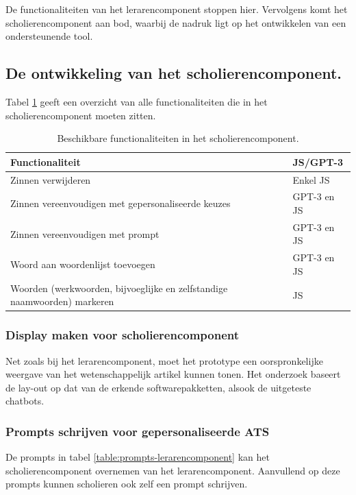 De functionaliteiten van het lerarencomponent stoppen hier. Vervolgens komt het scholierencomponent aan bod, waarbij de nadruk ligt op het ontwikkelen van een ondersteunende tool.

\subsection{De ontwikkeling van het scholierencomponent.}

Tabel \ref{table:beschikbare-functionaliteiten-scholierencomponent} geeft een overzicht van alle functionaliteiten die in het scholierencomponent moeten zitten.

\begin{table}
	\begin{tabular}{| m{10cm} | m{5cm} |}
		\hline
		\textbf{Functionaliteit} & \textbf{JS/GPT-3} \\ \hline
		Zinnen verwijderen & Enkel JS \\ \hline
		Zinnen vereenvoudigen met gepersonaliseerde keuzes & GPT-3 en JS \\ \hline
		Zinnen vereenvoudigen met prompt & GPT-3 en JS \\ \hline
		Woord aan woordenlijst toevoegen & GPT-3 en JS \\ \hline
		Woorden (werkwoorden, bijvoeglijke en zelfstandige naamwoorden) markeren & JS \\ \hline
	\end{tabular}
	\caption{Beschikbare functionaliteiten in het scholierencomponent.}
	\label{table:beschikbare-functionaliteiten-scholierencomponent}
\end{table}

\subsubsection{Display maken voor scholierencomponent}

Net zoals bij het lerarencomponent, moet het prototype een oorspronkelijke weergave van het wetenschappelijk artikel kunnen tonen. Het onderzoek baseert de lay-out op dat van de erkende softwarepakketten, alsook de uitgeteste chatbots. 

\subsubsection{Prompts schrijven voor gepersonaliseerde ATS}

De prompts in tabel \ref{table:prompts-lerarencomponent} kan het scholierencomponent overnemen van het lerarencomponent. Aanvullend op deze prompts kunnen scholieren ook zelf een prompt schrijven.

